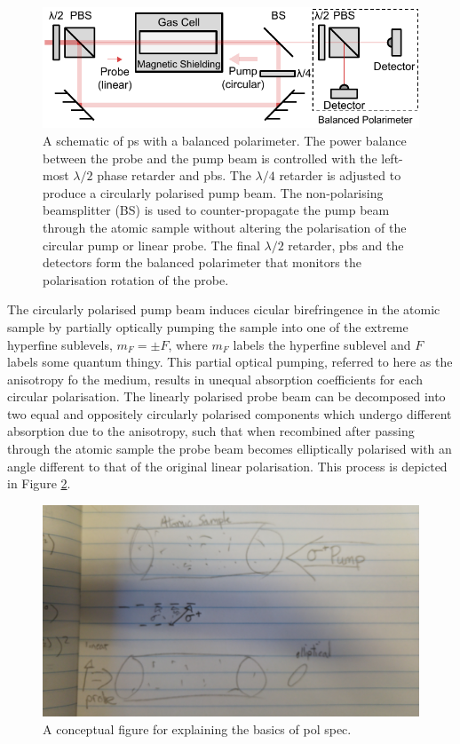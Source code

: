 \begin{figure}
\centering
\includegraphics[width=\linewidth]{chapter1/Figs/PolSpecSchematic.pdf}
\caption{A schematic of \gls{ps} with a balanced polarimeter. The power balance between the probe and the pump beam is controlled with the left-most $\lambda/2$ phase retarder and \gls{pbs}. The $\lambda/4$ retarder is adjusted to produce a circularly polarised pump beam. The non-polarising beamsplitter (BS) is used to counter-propagate the pump beam through the atomic sample without altering the polarisation of the circular pump or linear probe. The final $\lambda/2$ retarder, \gls{pbs} and the detectors form the balanced polarimeter that monitors the polarisation rotation of the probe.}
\label{figure:pol_spec_schematic}
\end{figure}

The circularly polarised pump beam induces cicular birefringence in the atomic sample by partially optically pumping the sample into one of the extreme hyperfine sublevels, $m_F=\pm F$, where $m_F$ labels the hyperfine sublevel and $F$ labels {\color{red}some quantum thingy.}
This partial optical pumping, referred to here as the anisotropy fo the medium, results in unequal absorption coefficients for each circular polarisation.
The linearly polarised probe beam can be decomposed into two equal and oppositely circularly polarised components which undergo different absorption due to the anisotropy, such that when recombined after passing through the atomic sample the probe beam becomes elliptically polarised with an angle different to that of the original linear polarisation.
This process is depicted in Figure \ref{figure:pol_spec_explanation}.

\begin{figure}
\centering
\includegraphics[width=\linewidth,angle=180]{chapter1/Figs/pol_spec_explanation_placeholder.jpg}
\caption{A conceptual figure for explaining the basics of pol spec.}
\label{figure:pol_spec_explanation}
\end{figure}

